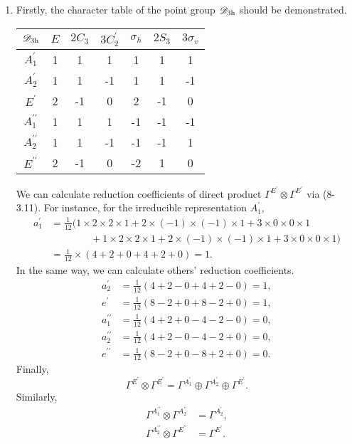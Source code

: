 \documentclass[a4paper]{book}
\begin{document}
\begin{solution}
\begin{enumerate}[label=(\alph*)]
		\item Firstly, the character table of the point group $\mathscr{D}_{\rm 3h}$ should be demonstrated.
		\begin{center}
		\begin{tabular}{ccccccc}\hline
	$\mathscr{D}_{\rm 3h}$ & $E$ & $2C_3$ & $3C^\prime_2$ & $\sigma_h$ & $2S_3$ &$3\sigma_v$ \\ \hline
			$A^\prime_1$	&	1	&	1	&	1	&	1	&	1	&	1	\\
			$A^\prime_2$	&	1	&	1	&	-1	&	1	&	1	&	-1	\\
			$E^\prime$		&	2	&	-1	&	0	&	2	&	-1	&	0	\\
			$A^{\prime\prime}_1$	&	1	&	1	&	1	&	-1	&	-1	&	-1	\\
			$A^{\prime\prime}_2$	&	1	&	1	&	-1	&	-1	&	-1	&	1	\\
			$E^{\prime\prime}$	&	2	&	-1	&	0	&	-2	&	1	&	0	\\ \hline
		\end{tabular}
		\end{center}
		
		We can calculate reduction coefficients of direct product $\Gamma^{E^\prime}\otimes\Gamma^{E^\prime}$ via (8-3.11). For instance, for the irreducible representation $A^\prime_1$,
		\begin{align*}
			a^\prime_{1} &= \frac{1}{12} ( 1 \times 2 \times 2 \times 1 + 2 \times (-1) \times (-1) \times 1 + 3 \times 0 \times 0 \times 1 \\
			&\hspace{4em} + 1 \times 2 \times 2 \times 1 + 2 \times (-1) \times (-1) \times 1 + 3 \times 0 \times 0 \times 1 ) \\
			&= \frac{1}{12} \times ( 4 + 2 + 0 + 4 + 2 + 0 ) = 1.
		\end{align*}
		In the same way, we can calculate others' reduction coefficients.
		\begin{align*}
			a^\prime_{2} &= \frac{1}{12} ( 4 + 2 - 0 + 4 + 2 - 0 )= 1, \\
			e^\prime &= \frac{1}{12} ( 8 - 2 + 0 + 8 - 2 + 0 )= 1, \\
			a^{\prime\prime}_{1} &= \frac{1}{12} ( 4 + 2 + 0 - 4 - 2 - 0 )= 0, \\
			a^{\prime\prime}_{2} &= \frac{1}{12} ( 4 + 2 - 0 - 4 - 2 + 0 )= 0, \\
			e^{\prime\prime} &= \frac{1}{12} ( 8 - 2 + 0 - 8 + 2 + 0 )= 0. 
		\end{align*}
		Finally, 
		\begin{equation}
			\Gamma^{E^\prime}\otimes\Gamma^{E^\prime} = \Gamma^{A^\prime_1} \oplus \Gamma^{A^\prime_2} \oplus \Gamma^{E^\prime}.
		\end{equation}
		Similarly,
		\begin{align}
			\Gamma^{A^{\prime\prime}_1}\otimes \Gamma^{A^{\prime\prime}_2} &= \Gamma^{A^{\prime}_2}, \\
			\Gamma^{A^{\prime\prime}_2}\otimes \Gamma^{E^{\prime\prime}} &= \Gamma^{E^{\prime}}.
		\end{align}
		

\end{enumerate}
\end{solution}
\end{document}

